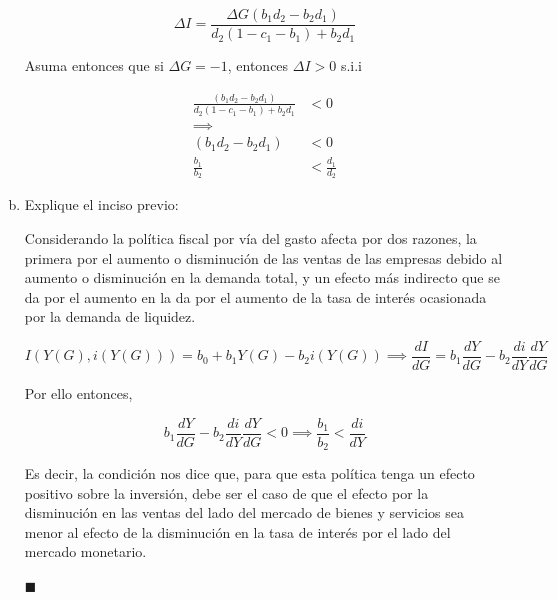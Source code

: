 \begin{enumerate}[(a)]
\begin{equation}
    \Delta I = \frac{\Delta G(b_{1}d_{2}-b_{2}d_{1})}{d_{2}(1-c_{1}-b_{1})+b_{2}d_{1}}
\end{equation}

Asuma entonces que si $\Delta G=-1$, entonces $\Delta I>0$ s.i.i

\begin{align}
    \frac{(b_{1}d_{2}-b_{2}d_{1})}{d_{2}(1-c_{1}-b_{1})+b_{2}d_{1}} & <0\\
    \nonumber \implies & \\
    (b_{1}d_{2}-b_{2}d_{1}) & <0 \\
    \frac{b_{1}}{b_{2}} & < \frac{d_{1}}{d_{2}}
\end{align}

\item Explique el inciso previo:

Considerando la política fiscal por vía del gasto afecta por dos razones, la primera por el aumento o disminución de las ventas de las empresas debido al aumento o disminución en la demanda total, y un efecto más indirecto que se da por el aumento en la da por el aumento de la tasa de interés ocasionada por la demanda de liquidez.

\begin{equation}
    I(Y(G), i(Y(G))) = b_{0}+b_{1}Y(G) -b_{2}i(Y(G)) \implies \frac{dI}{dG} = b_{1}\frac{dY}{dG}-b_{2}\frac{di}{dY}\frac{dY}{dG}
\end{equation}

Por ello entonces,

\begin{equation}
    b_{1}\frac{dY}{dG}-b_{2}\frac{di}{dY}\frac{dY}{dG} < 0 \implies \frac{b_{1}}{b_{2}} < \frac{di}{dY}
\end{equation}

Es decir, la condición nos dice que, para que esta política tenga un efecto positivo sobre la inversión, debe ser el caso de que el efecto por la disminución en las ventas del lado del mercado de bienes y servicios sea menor al efecto de la disminución en la tasa de interés por el lado del mercado monetario.

$\blacksquare$
\end{enumerate}